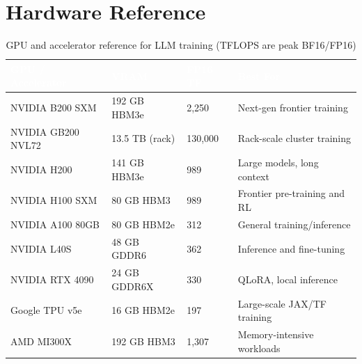 \chapter{Hardware Reference}

\begin{table}[H]
\centering\small\sffamily
{}
\begin{tabular}{L{3cm}L{2.5cm}C{2cm}L{3.5cm}}
\toprule
{}\textcolor{white}{\textbf{GPU / Accelerator}} & \textcolor{white}{\textbf{VRAM}} & \textcolor{white}{\textbf{FP16 TF}} & \textcolor{white}{\textbf{Best For}} \\
\midrule
NVIDIA B200 SXM & 192 GB HBM3e & 2,250 & Next-gen frontier training \\
NVIDIA GB200 NVL72 & 13.5 TB (rack) & 130,000 & Rack-scale cluster training \\
NVIDIA H200 & 141 GB HBM3e & 989 & Large models, long context \\
NVIDIA H100 SXM & 80 GB HBM3 & 989 & Frontier pre-training and RL \\
NVIDIA A100 80GB & 80 GB HBM2e & 312 & General training/inference \\
NVIDIA L40S & 48 GB GDDR6 & 362 & Inference and fine-tuning \\
NVIDIA RTX 4090 & 24 GB GDDR6X & 330 & QLoRA, local inference \\
Google TPU v5e & 16 GB HBM2e & 197 & Large-scale JAX/TF training \\
AMD MI300X & 192 GB HBM3 & 1,307 & Memory-intensive workloads \\
\bottomrule
\end{tabular}
\caption{GPU and accelerator reference for LLM training (TFLOPS are peak BF16/FP16)}
\end{table}
